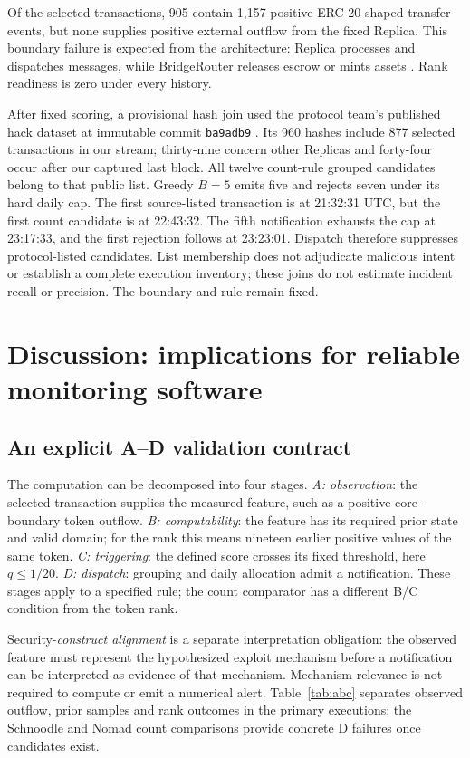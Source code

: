 \documentclass[preprint,12pt,authoryear]{elsarticle}
\begin{document}
Of the selected transactions, 905 contain 1,157 positive ERC-20-shaped transfer events, but none supplies positive external outflow from the fixed Replica. This boundary failure is expected from the architecture: Replica processes and dispatches messages, while BridgeRouter releases escrow or mints assets \citep{NomadArchitecture,Nomad2022RCA}. Rank readiness is zero under every history.

After fixed scoring, a provisional hash join used the protocol team's published hack dataset at immutable commit \texttt{ba9adb9} \citep{Nomad2022HackData}. Its 960 hashes include 877 selected transactions in our stream; thirty-nine concern other Replicas and forty-four occur after our captured last block. All twelve count-rule grouped candidates belong to that public list. Greedy $B=5$ emits five and rejects seven under its hard daily cap. The first source-listed transaction is at 21:32:31 UTC, but the first count candidate is at 22:43:32. The fifth notification exhausts the cap at 23:17:33, and the first rejection follows at 23:23:01. Dispatch therefore suppresses protocol-listed candidates. List membership does not adjudicate malicious intent or establish a complete execution inventory; these joins do not estimate incident recall or precision. The boundary and rule remain fixed.

\section{Discussion: implications for reliable monitoring software}\label{sec:discussion}
\subsection{An explicit A--D validation contract}
The computation can be decomposed into four stages. \emph{A: observation}: the selected transaction supplies the measured feature, such as a positive core-boundary token outflow. \emph{B: computability}: the feature has its required prior state and valid domain; for the rank this means nineteen earlier positive values of the same token. \emph{C: triggering}: the defined score crosses its fixed threshold, here $q\leq1/20$. \emph{D: dispatch}: grouping and daily allocation admit a notification. These stages apply to a specified rule; the count comparator has a different B/C condition from the token rank.

Security-\emph{construct alignment} is a separate interpretation obligation: the observed feature must represent the hypothesized exploit mechanism before a notification can be interpreted as evidence of that mechanism. Mechanism relevance is not required to compute or emit a numerical alert. Table~\ref{tab:abc} separates observed outflow, prior samples and rank outcomes in the primary executions; the Schnoodle and Nomad count comparisons provide concrete D failures once candidates exist.
\end{document}
